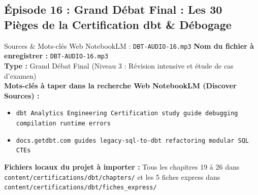 \documentclass[11pt,a4paper]{article}
\begin{document}
\subsection{Épisode 16 : Grand Débat Final : Les 30 Pièges de la Certification dbt \& Débogage}
\begin{sourcebox}{Sources \& Mots-clés Web NotebookLM : \texttt{DBT-AUDIO-16.mp3}}
\textbf{Nom du fichier à enregistrer :} \texttt{DBT-AUDIO-16.mp3}\\
\textbf{Type :} Grand Débat Final (Niveau 3 : Révision intensive et étude de cas d'examen)\\
\textbf{Mots-clés à taper dans la recherche Web NotebookLM (Discover Sources) :}
\begin{itemize}[noitemsep]
    \item \texttt{dbt Analytics Engineering Certification study guide debugging compilation runtime errors}
    \item \texttt{docs.getdbt.com guides legacy-sql-to-dbt refactoring modular SQL CTEs}
\end{itemize}
\textbf{Fichiers locaux du projet à importer :}
Tous les chapitres 19 à 26 dans \texttt{content/certifications/dbt/chapters/} et les 5 fiches express dans \texttt{content/certifications/dbt/fiches_express/}
\end{sourcebox}
\end{document}
